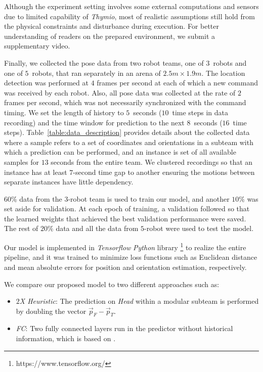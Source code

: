 \documentclass[letterpaper, 10 pt, conference]{ieeeconf}  %
\begin{document}
	Although the experiment setting involves 
	some external computations and sensors due to limited capability of \emph{Thymio}, 
	most of realistic assumptions still hold from the physical constraints and disturbance
	during execution. For better understanding of readers on the prepared environment, 
	we submit a supplementary video. 
	
	Finally, we collected the pose data from two robot teams, one of $3$~robots and one 
	of $5$~robots, that ran separately in an arena of $2.5 m \times 1.9 m$.  
	The location detection was performed at $4$ frames per second at each of
	which a new command was received by each robot. Also, all pose data was 
	collected at the rate of $2$ frames per second, 
	which was not necessarily synchronized with the command timing. 
	We set the length of history to $5$~seconds ($10$~time steps in data recording) and 
	the time window for prediction to the next $8$~seconds ($16$~time steps).  
	Table~\ref{table:data_description} provides details about the collected data
	where a sample refers to a set of coordinates and orientations in a subteam 
	with which a prediction can be performed, and an instance is set of all available samples for $13$ seconds from the entire team. We clustered recordings so that 
	an instance has at least $7$-second time gap to another ensuring
	the motions between separate instances have little dependency. 
	
	$60$\% data from the $3$-robot team is used to train our model, and another $10\%$
	was set aside for validation. At each epoch of training, a validation followed so that
	the learned weights that achieved the best validation performance were saved. 
	The rest of $20\%$ data and all the data from $5$-robot were used to test the model.
	
	Our model is implemented in \emph{Tensorflow} \emph{Python} library \footnote{https://www.tensorflow.org/} 
	to realize the entire pipeline, and it was trained to minimize 
	loss functions such as Euclidean distance and mean absolute errors 
	for position and orientation estimation, respectively.
	
	We compare our proposed model to two different approaches such as: 
	\begin{itemize}
		\item \emph{$2$X Heuristic}: 
		The prediction on \emph{Head} within a modular subteam is performed by doubling the vector 
		$\vec{p}_{F} - \vec{p}_{T}$.
		
		\item \emph{FC}: 
		Two fully connected layers run in the predictor without historical 
		information, which is based on \cite{CPR17}.  
	
	\end{itemize}	
\end{document}
